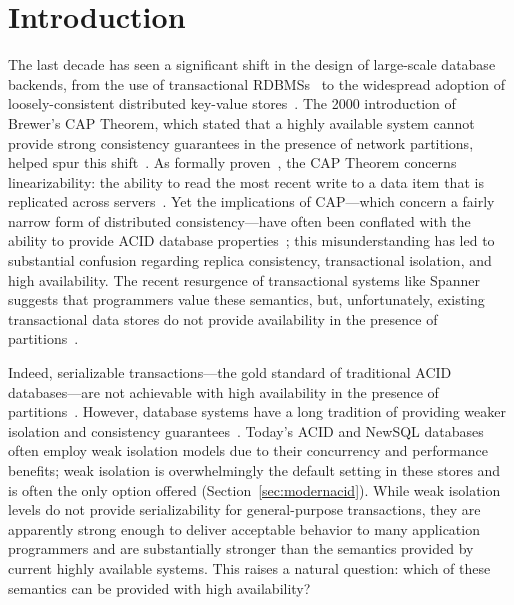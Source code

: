 
\section{Introduction}

The last decade has seen a significant shift in the design of
large-scale database backends, from the use of transactional
RDBMSs~\cite{bernstein-book, gray-isolation, gray-virtues} to the
widespread adoption of loosely-consistent distributed key-value
stores~\cite{bigtable, pnuts, dynamo}. The 2000 introduction of
Brewer's CAP Theorem, which stated that a highly available system
cannot provide strong consistency guarantees in the presence of
network partitions, helped spur this shift~\cite{brewer-slides}. As
formally proven~\cite{gilbert-cap}, the CAP Theorem concerns
linearizability: the ability to read the most recent write to a data
item that is replicated across servers~\cite{herlihy-art}. Yet the
implications of CAP---which concern a fairly narrow form of
distributed consistency---have often been conflated with the ability
to provide ACID database properties~\cite{brewer-slides, hn,
  foundation-article}; this misunderstanding has led to substantial
confusion regarding replica consistency, transactional isolation, and
high availability. The recent resurgence of transactional systems like
Spanner~\cite{spanner} suggests that programmers value these
semantics, but, unfortunately, existing transactional data stores do
not provide availability in the presence of
partitions~\cite{middleware-db, foundation-article,
  hstore,generalizedsnapshot, mdcc, krikellas-bargain, eiger, walter,
  calvin}.

Indeed, serializable transactions---the gold standard of traditional
ACID databases---are not achievable with high availability in the
presence of partitions~\cite{davidson-survey}. However, database
systems have a long tradition of providing weaker isolation and
consistency guarantees~\cite{adya, ansicritique, gray-virtues,
  gray-isolation, kemme-thesis}. Today's ACID and NewSQL databases
often employ weak isolation models due to their concurrency and
performance benefits; weak isolation is overwhelmingly the default
setting in these stores and is often the only option offered
(Section~\ref{sec:modernacid}). While weak isolation levels do not
provide serializability for general-purpose transactions, they are
apparently strong enough to deliver acceptable behavior to many
application programmers and are substantially stronger than the
semantics provided by current highly available systems. This raises a
natural question: which of these semantics can be provided with high
availability?


